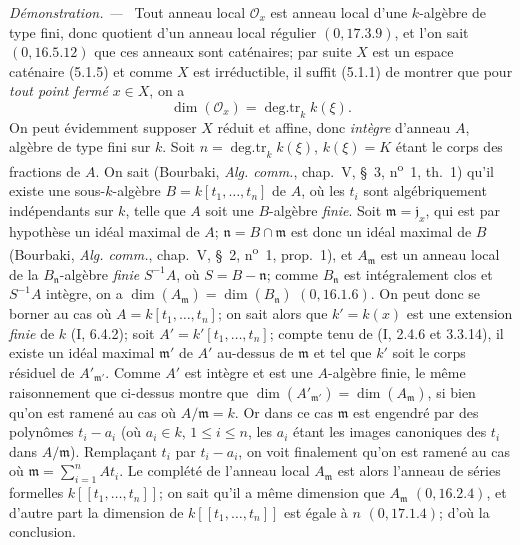 \documentclass[10pt,oneside]{book}
\newenvironment{proof}{%
  \par\medskip\noindent\textit{Démonstration. ---\ }}{\par}
\begin{document}
\begin{proof}
Tout anneau local $\mathcal O_x$ est anneau local d'une $k$-algèbre de type
fini, donc quotient d'un anneau local régulier $(0,17.3.9)$, et l'on sait
$(0,16.5.12)$ que ces anneaux sont caténaires; par suite $X$ est un espace
caténaire (5.1.5) et comme $X$ est irréductible, il suffit (5.1.1) de montrer
que pour \emph{tout point fermé} $x\in X$, on a
\begin{equation}
\dim(\mathcal O_x)=\operatorname{deg.tr}_k k(\xi).
\tag{5.2.1.1}\label{IV.2.5.2.1.1-fr}
\end{equation}
On peut évidemment supposer $X$ réduit et affine, donc \emph{intègre}
d'anneau $A$, algèbre de type fini sur $k$. Soit
$n=\operatorname{deg.tr}_k k(\xi)$, $k(\xi)=K$ étant le corps des fractions
de $A$. On sait (Bourbaki, \emph{Alg. comm.}, chap.~V, \S~3,
n\textsuperscript{o}~1, th.~1) qu'il existe une sous-$k$-algèbre
$B=k[t_1,\ldots,t_n]$ de $A$, où les $t_i$ sont algébriquement indépendants
sur $k$, telle que $A$ soit une $B$-algèbre \emph{finie}. Soit
$\mathfrak m=\mathfrak j_x$, qui est par hypothèse un idéal maximal de $A$;
$\mathfrak n=B\cap\mathfrak m$ est donc un idéal maximal de $B$ (Bourbaki,
\emph{Alg. comm.}, chap.~V, \S~2, n\textsuperscript{o}~1, prop.~1), et
$A_{\mathfrak m}$ est un anneau local de la $B_{\mathfrak n}$-algèbre
\emph{finie} $S^{-1}A$, où $S=B-\mathfrak n$; comme $B_{\mathfrak n}$ est
intégralement clos et $S^{-1}A$ intègre, on a
$\dim(A_{\mathfrak m})=\dim(B_{\mathfrak n})$ $(0,16.1.6)$. On peut donc se
borner au cas où $A=k[t_1,\ldots,t_n]$; on sait alors que
$k'=k(x)$ est une extension \emph{finie} de $k$ (I, 6.4.2); soit
$A'=k'[t_1,\ldots,t_n]$; compte tenu de (I, 2.4.6 et 3.3.14), il existe un
idéal maximal $\mathfrak m'$ de $A'$ au-dessus de $\mathfrak m$ et tel que
$k'$ soit le corps résiduel de $A'_{\mathfrak m'}$. Comme $A'$ est intègre et
est une $A$-algèbre finie, le même raisonnement que ci-dessus montre que
$\dim(A'_{\mathfrak m'})=\dim(A_{\mathfrak m})$, si bien qu'on est ramené au
cas où $A/\mathfrak m=k$. Or dans ce cas $\mathfrak m$ est engendré par des
polynômes $t_i-a_i$ (où $a_i\in k$, $1\leq i\leq n$, les $a_i$ étant les
images canoniques des $t_i$ dans $A/\mathfrak m$). Remplaçant $t_i$ par
$t_i-a_i$, on voit finalement qu'on est ramené au cas où
$\mathfrak m=\sum_{i=1}^nAt_i$. Le complété de l'anneau local
$A_{\mathfrak m}$ est alors l'anneau de séries formelles
$k[[t_1,\ldots,t_n]]$; on sait qu'il a même dimension que $A_{\mathfrak m}$
$(0,16.2.4)$, et d'autre part la dimension de $k[[t_1,\ldots,t_n]]$ est égale
à $n$ $(0,17.1.4)$; d'où la conclusion.
\end{proof}
\end{document}
